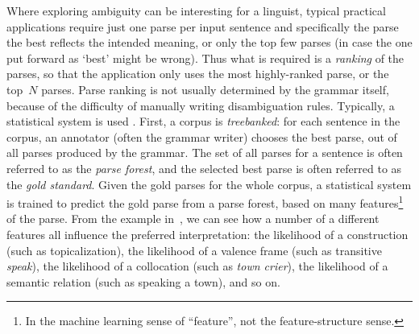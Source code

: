 \documentclass[output=paper,nonflat]{langsci/langscibook}
\begin{document}
Where exploring ambiguity can be interesting for a linguist, typical practical applications require just one parse per input sentence and specifically the parse the best reflects the intended meaning, or only the top few parses (in case the one put forward as `best' might be wrong).
Thus what is required is a \textit{ranking} of the parses,
so that the application only uses the most highly-ranked parse,
or the top~$N$ parses.
Parse ranking is not usually determined by the grammar itself,
because of the difficulty of manually writing disambiguation rules.
Typically, a statistical system is used \citep{OFTM2004a-u-platte}.
First, a corpus is \textit{treebanked}:
for each sentence in the corpus,
an annotator (often the grammar writer) chooses the best parse,
out of all parses produced by the grammar.
The set of all parses for a sentence is often referred to as the \textit{parse forest},
and the selected best parse is often referred to as the \textit{gold standard}.
Given the gold parses for the whole corpus, a statistical system is trained
to predict the gold parse from a parse forest,
based on many features\footnote{%
	In the machine learning sense of ``feature'',
	not the feature-structure sense.
}
of the parse.
From the example in~,
we can see how a number of a different features all influence the preferred interpretation:
the likelihood of a construction (such as topicalization),
the likelihood of a valence frame (such as transitive \textit{speak}),
the likelihood of a collocation (such as \textit{town crier}),
the likelihood of a semantic relation (such as speaking a town),
and so on.


\end{document}
